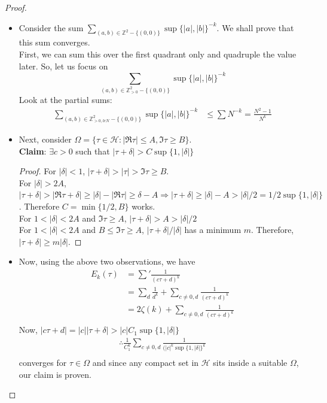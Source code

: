\documentclass[oneside, 12pt]{scrbook}
\newcommand{\ZZ}{\mathbb Z}
\newcommand{\ds}{\displaystyle}
\newcommand{\Hh}{\mathcal{H}}
\theoremstyle{theorem}
\begin{document}
\begin{proof}
\begin{itemize}
\item Consider the sum $\ds{\sum_{(a,b) \in \ZZ^2 - \{(0,0)\}} \sup \{|a|, |b|\}^{-k}}$. We shall prove that this sum converges.\\
First, we can sum this over the first quadrant only and quadruple the value later. So, let us focus on $$\sum_{(a,b) \in \ZZ_{>0}^2 - \{(0,0)\}} \sup \{|a|, |b|\}^{-k}$$
Look at the partial sums: 
\begin{align*}
\sum_{(a,b) \in \ZZ_{>0,le N }^2 - \{(0,0)\}} \sup \{|a|, |b|\}^{-k} &\le \sum N^{-k} = \frac{N^2-1}{N^k}
\end{align*}
\item Next, consider $\Omega = \{\tau \in \Hh : |\mathfrak{R}\tau|\le A, \mathfrak{I}\tau \geq B\}$.\\
\textbf{Claim}: $\exists c >0$ such that $|\tau + \delta|>C \sup\{1,|\delta|\}$
\begin{proof}
For $|\delta|<1$, $|\tau + \delta| > |\tau|> \mathfrak{I}\tau \geq B$. \\
For $|\delta|>2A$, $|\tau + \delta| > |\mathfrak{R}\tau + \delta|\geq |\delta |- |\mathfrak{R}\tau| \geq \delta - A \Rightarrow |\tau + \delta|\geq |\delta|-A > |\delta|/2 = 1/2 \sup\{1, |\delta|\}$. Therefore $C = \min\{1/2,B\}$ works.\\
For $1<|\delta|<2A$ and $\mathfrak{I}\tau \geq A$, $|\tau + \delta|>A > |\delta|/2$\\
For $1<|\delta|<2A$ and $B \le \mathfrak{I}\tau \geq A$, $|\tau + \delta|/|\delta|$ has a minimum $m$. Therefore, $|\tau + \delta| \geq m |\delta|$.
\end{proof}
\item Now, using the above two observations, we have 
\begin{align*}
E_{k}(\tau) &= \sum' \frac{1}{(c\tau +d)^k} \\
&= \sum_{d} \frac{1}{d^k} + \sum_{c\neq 0, d} \frac{1}{(c\tau +d)^k}\\
&= 2\zeta(k) + \sum_{c\neq 0, d} \frac{1}{(c\tau +d)^k}\\
\end{align*}
Now, $|c\tau +d| = |c||\tau + \delta|> |c|C_{1}\sup\{1, |\delta|\}$
\begin{align*}
\therefore \frac{1}{C_{1}^k} \sum_{c\neq 0, d} \frac{1}{(|c|^k\sup\{1, |\delta|\}^k}\\
\end{align*} converges for $\tau \in \Omega$ and since any compact set in $\Hh$ sits inside a suitable $\Omega$, our claim is proven.
\end{itemize}
\end{proof}
\end{document}

